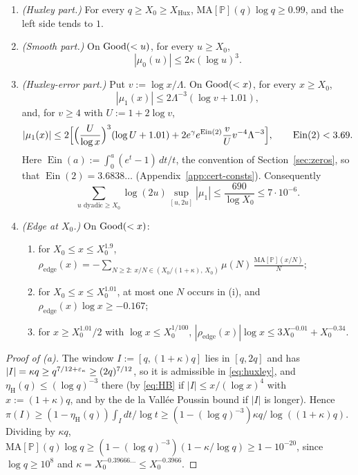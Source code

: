 \begin{lemma}\label{lem:margin}
\leavevmode
\begin{enumerate}[label=(\alph*)]
\item \emph{(Huxley part.)} For every $q\ge X_0\ge X_{\mathrm{Hux}}$, $\mathrm{MA}[\mathbb P](q)\log q\ge0.99$, and the left side tends to $1$.
\item \emph{(Smooth part.)} On $\mathrm{Good}(<u)$, for every $u\ge X_0$,
\[
  |\mu_0(u)|\le2\kappa(\log u)^3.
\]
\item \emph{(Huxley-error part.)} Put $v:=\log x/\Lambda$. On $\mathrm{Good}(<x)$, for every $x\ge X_0$,
\[
  |\mu_1(x)|\le2\Lambda^{-3}(\log v+1.01),
\]
and, for $v\ge4$ with $U:=1+2\log v$,
\[
  |\mu_1(x)|\le2\Bigl[\Bigl(\frac U{\log x}\Bigr)^3(\log U+1.01)+2e^{\gamma}e^{\operatorname{Ein}(2)}\frac vUv^{-4}\Lambda^{-3}\Bigr],
  \qquad\operatorname{Ein}(2)<3.69.
\]
Here $\operatorname{Ein}(a):=\int_0^a(e^t-1)\,dt/t$, the convention of Section~\ref{sec:zeros}, so that
$\operatorname{Ein}(2)=3.6838\ldots$ (Appendix~\ref{app:cert-consts}). Consequently
\begin{equation}\label{eq:mu1sum}
  \sum_{u\text{ dyadic}\ge X_0}\log(2u)\sup_{[u,2u]}|\mu_1|\le\frac{690}{\log X_0}\le7\cdot10^{-6}.
\end{equation}
\item \emph{(Edge at $X_0$.)} On $\mathrm{Good}(<x)$:
\begin{enumerate}[label=(\roman*)]
\item for $X_0\le x\le X_0^{1.9}$, $\displaystyle\rho_{\mathrm{edge}}(x)=-\sum_{N\ge2:\ x/N\in(X_0/(1+\kappa),\,X_0)}\mu(N)\,
  \frac{\mathrm{MA}[\mathbb P](x/N)}N$;
\item for $X_0\le x\le X_0^{1.01}$, at most one $N$ occurs in (i), and $\rho_{\mathrm{edge}}(x)\log x\ge-0.167$;
\item for $x\ge X_0^{1.01}/2$ with $\log x\le X_0^{1/100}$, $|\rho_{\mathrm{edge}}(x)|\log x\le3X_0^{-0.01}+X_0^{-0.34}$.
\end{enumerate}
\end{enumerate}
\end{lemma}

\begin{proof}[Proof of (a)]
The window $I:=[q,(1+\kappa)q]$ lies in $[q,2q]$ and has $|I|=\kappa q\ge q^{7/12+\varepsilon_\kappa}\ge(2q)^{7/12}$, so it is admissible in
\eqref{eq:huxley}, and $\eta_{\mathrm H}(q)\le(\log q)^{-3}$ there (by \eqref{eq:HB} if $|I|\le x/(\log x)^4$ with $x:=(1+\kappa)q$, and by the de
la Vall\'ee Poussin bound if $|I|$ is longer). Hence $\pi(I)\ge(1-\eta_{\mathrm H}(q))\int_Idt/\log t\ge(1-(\log q)^{-3})\kappa q/\log((1+\kappa)q)$.
Dividing by $\kappa q$,
$\mathrm{MA}[\mathbb P](q)\log q\ge(1-(\log q)^{-3})(1-\kappa/\log q)\ge1-10^{-20}$, since $\log q\ge10^8$ and $\kappa=X_0^{-0.39666\ldots}\le X_0^{-0.3966}$.
\end{proof}

